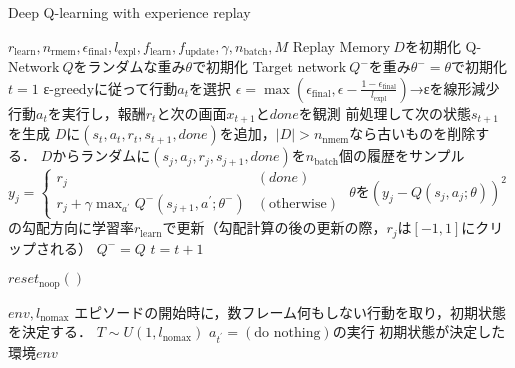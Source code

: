 \documentclass{jarticle}
\begin{document}
\begin{algorithm}[tb]
\caption{Deep Q-learning with experience replay}
\label{alg:dqn}                          
\begin{algorithmic}[1]   
\REQUIRE $r_{\mathrm{learn}},n_{\mathrm{rmem}},\epsilon_{\mathrm{final}},l_{\mathrm{expl}},f_{\mathrm{learn}},f_{\mathrm{update}},\gamma,n_{\mathrm{batch}}, M$
\STATE Replay Memory$~D$を初期化
\STATE Q-Network$~Q$をランダムな重み$\theta$で初期化
\STATE Target network$~Q^-$を重み$\theta^-=\theta$で初期化
\STATE $t=1$
\STATE ε-greedyに従って行動$a_t$を選択
\STATE $\epsilon=\max{(\epsilon_{\mathrm{final}},\epsilon-\frac{1-\epsilon_{\mathrm{final}}}{l_{\mathrm{expl}}})}$→εを線形減少
\STATE 行動$a_t$を実行し，報酬$r_t$と次の画面$x_{t+1}$と$done$を観測
\STATE 前処理して次の状態$s_{t+1}$を生成
\STATE $D$に$(s_t,a_t,r_t,s_{t+1},done)$を追加，$|D|>n_{\mathrm{nmem}}$なら古いものを削除する．
\STATE $D$からランダムに$(s_j,a_j,r_j,s_{j+1},done)$を$n_{\mathrm{batch}}$個の履歴をサンプル
\STATE $y_j=
\begin{cases}
r_j & (done) \\
r_j+\gamma\max_{a^{\prime}}Q^-(s_{j+1},a^{\prime};\theta^-) & (\mbox{otherwise})
\end{cases}$
\STATE $\theta$を$(y_j-Q(s_j,a_j;\theta))^2$の勾配方向に学習率$r_{\mathrm{learn}}$で更新（勾配計算の後の更新の際，$r_j$は$[-1,1]$にクリップされる）
\ENDIF
{}
\STATE $Q^-=Q$
\ENDIF
\ENDIF
\STATE $t=t+1$
\ENDWHILE
\ENDFOR
\end{algorithmic}
\end{algorithm}

\begin{algorithm}[tb]
\caption{$reset_{\mathrm{noop}}()$}
\label{alg:noop_reset}                          
\begin{algorithmic}[1]   
\REQUIRE $env, l_{\mathrm{nomax}}$
\STATE エピソードの開始時に，数フレーム何もしない行動を取り，初期状態を決定する．
\STATE $T\sim U(1,l_{\mathrm{nomax}})$
\STATE $a_{t^{\prime}}=(\mbox{do nothing})$の実行
\ENDFOR
\ENSURE 初期状態が決定した環境$env$
\end{algorithmic}
\end{algorithm}
\end{document}
